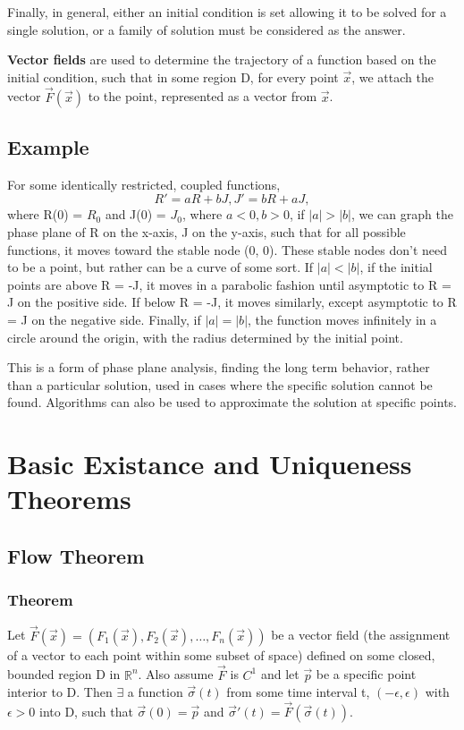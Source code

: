 \documentclass[11 pt, twoside]{article}
\newcommand{\realn}{\mathbb{R}^n}
\begin{document}
Finally, in general, either an initial condition is set allowing it to be solved for a single solution, or a family of solution must be considered as the answer.

\textbf{Vector fields} are used to determine the trajectory of a function based on the initial condition, such that in some region D, for every point $\vec{x}$, we attach the vector $\vec{F}(\vec{x})$ to the point, represented as a vector from $\vec{x}$.

\subsection{Example}

For some identically restricted, coupled functions, $$R' = aR + bJ, J' = bR + aJ,$$ where R(0) = $R_0$ and J(0) = $J_0$, where $a < 0, b > 0$, if $|a| > |b|$, we can graph the phase plane of R on the x-axis, J on the y-axis, such that for all possible functions, it moves toward the stable node (0, 0). These stable nodes don't need to be a point, but rather can be a curve of some sort. If $|a| < |b|$, if the initial points are above R = -J, it moves in a parabolic fashion until asymptotic to R = J on the positive side. If below R = -J, it moves similarly, except asymptotic to R = J on the negative side. Finally, if $|a| = |b|$, the function moves infinitely in a circle around the origin, with the radius determined by the initial point.

This is a form of phase plane analysis, finding the long term behavior, rather than a particular solution, used in cases where the specific solution cannot be found. Algorithms can also be used to approximate the solution at specific points.

\section{Basic Existance and Uniqueness Theorems}

\subsection{Flow Theorem}
\subsubsection{Theorem} 
Let $\vec{F}(\vec{x}) = (F_1(\vec{x}), F_2(\vec{x}), \dots, F_n(\vec{x}))$ be a vector field (the assignment of a vector to each point within some subset of space) defined on some closed, bounded region D in $\realn$. Also assume $\vec{F}$ is $C^1$ and let $\vec{p}$ be a specific point interior to D. Then $\exists$ a function $\vec{\sigma}(t)$ from some time interval t, $(-\epsilon, \epsilon)$ with $\epsilon > 0$ into D, such that $\vec{\sigma}(0) = \vec{p}$ and $\vec{\sigma}'(t) = \vec{F}(\vec{\sigma}(t)).$
\end{document}
